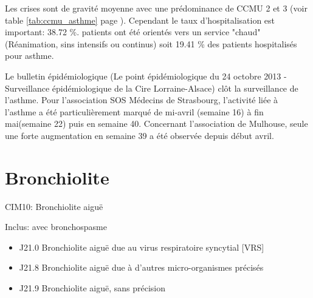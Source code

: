 \documentclass[12pt,english,french,twoside]{report}\usepackage[]{graphicx}\usepackage[]{color}
\begin{document}
Les crises sont de gravité moyenne avec une prédominance de CCMU 2 et 3 (voir table \ref{tab:ccmu_asthme} page \pageref{tab:ccmu_asthme}).
Cependant le taux d'hospitalisation est important: 38.72 \%.
 patients ont été orientés vers un service "chaud" (Réanimation, sins intensifs ou continus) soit 19.41 \% des patients hospitalisés pour asthme.

Le bulletin épidémiologique (Le point épidémiologique du 24 octobre 2013 - Surveillance épidémiologique de la Cire Lorraine-Alsace) clôt la surveillance de l’asthme. Pour l’association SOS Médecins de Strasbourg, l’activité liée à l’asthme a été particulièrement marqué de mi-avril (semaine 16) à fin mai(semaine 22) puis en semaine 40. Concernant l’association de Mulhouse, seule une forte augmentation en semaine 39 a été observée depuis début avril.

\section{Bronchiolite}

CIM10: Bronchiolite aiguë

Inclus:
    avec bronchospasme
\begin{itemize}
  \item J21.0 Bronchiolite aiguë due au virus respiratoire syncytial [VRS]
  \item J21.8 Bronchiolite aiguë due à d'autres micro-organismes précisés
  \item J21.9 Bronchiolite aiguë, sans précision
\end{itemize}
\end{document}
